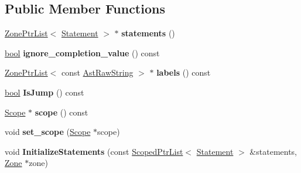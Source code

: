 \subsection*{Public Member Functions}
\begin{DoxyCompactItemize}
\item 
\mbox{\label{classv8_1_1internal_1_1Block_a4ad529e0011f51cec5bbd417eff324ae}} 
\mbox{\hyperlink{classv8_1_1internal_1_1ZoneList}{Zone\+Ptr\+List}}$<$ \mbox{\hyperlink{classv8_1_1internal_1_1Statement}{Statement}} $>$ $\ast$ {\bfseries statements} ()
\item 
\mbox{\label{classv8_1_1internal_1_1Block_a27fa11177fb7bf63d7304c0d3f6f0137}} 
\mbox{\hyperlink{classbool}{bool}} {\bfseries ignore\+\_\+completion\+\_\+value} () const
\item 
\mbox{\label{classv8_1_1internal_1_1Block_a3dadf70dd467f8bef583bf94e6becb44}} 
\mbox{\hyperlink{classv8_1_1internal_1_1ZoneList}{Zone\+Ptr\+List}}$<$ const \mbox{\hyperlink{classv8_1_1internal_1_1AstRawString}{Ast\+Raw\+String}} $>$ $\ast$ {\bfseries labels} () const
\item 
\mbox{\label{classv8_1_1internal_1_1Block_a35cb0fade7837e75e6df13dd99b01fd0}} 
\mbox{\hyperlink{classbool}{bool}} {\bfseries Is\+Jump} () const
\item 
\mbox{\label{classv8_1_1internal_1_1Block_ae9a11e08ec403930fd6c66a92143d836}} 
\mbox{\hyperlink{classv8_1_1internal_1_1Scope}{Scope}} $\ast$ {\bfseries scope} () const
\item 
\mbox{\label{classv8_1_1internal_1_1Block_a4a47d745c43ea05ebb7caeb1c69525b3}} 
void {\bfseries set\+\_\+scope} (\mbox{\hyperlink{classv8_1_1internal_1_1Scope}{Scope}} $\ast$scope)
\item 
\mbox{\label{classv8_1_1internal_1_1Block_a02cc93a09b64bb1e66798dd9190f5cf6}} 
void {\bfseries Initialize\+Statements} (const \mbox{\hyperlink{classv8_1_1internal_1_1ScopedPtrList}{Scoped\+Ptr\+List}}$<$ \mbox{\hyperlink{classv8_1_1internal_1_1Statement}{Statement}} $>$ \&statements, \mbox{\hyperlink{classv8_1_1internal_1_1Zone}{Zone}} $\ast$zone)
\end{DoxyCompactItemize}
